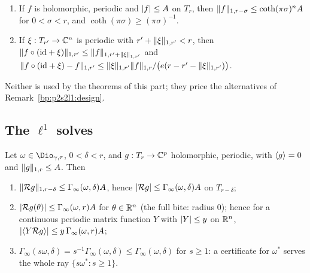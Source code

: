 \begin{lemma}\label{bp:p2s2l1:convert}
\begin{enumerate}[label=(\alph*)]
\item If $f$ is holomorphic, periodic and $\lvert f\rvert\le A$ on $T_r$, then $\lVert f\rVert_{1,r-\sigma}\le\coth(\pi\sigma)^nA$ for $0<\sigma<r$, and
  $\coth(\pi\sigma)\ge(\pi\sigma)^{-1}$.
\item If $\xi:T_{r'}\to\mathbb{C}^n$ is periodic with $r'+\lVert \xi\rVert_{1,r'}<r$, then $\lVert f\circ(\mathrm{id}+\xi)\rVert_{1,r'}\le\lVert f\rVert_{1,r'+\lVert \xi\rVert_{1,r'}}$
  and $\lVert f\circ(\mathrm{id}+\xi)-f\rVert_{1,r'}\le\lVert \xi\rVert_{1,r'}\lVert f\rVert_{1,r}/\bigl(e(r-r'-\lVert \xi\rVert_{1,r'})\bigr)$.
\end{enumerate}
Neither is used by the theorems of this part; they price the alternatives of Remark~\ref{bp:p2s2l1:design}.
\end{lemma}

\subsection{The $\ell^1$ solves}\label{bp:p2s2l1:sec-solve}

\begin{lemma}\label{bp:p2s2l1:solve}
Let $\omega\in\Dio_{\gamma,\tau}$, $0<\delta<r$, and $g:T_r\to\mathbb{C}^p$ holomorphic, periodic, with $\langle g\rangle=0$ and $\lVert g\rVert_{1,r}\le A$. Then
\begin{enumerate}[label=(\alph*)]
\item $\lVert \mathcal Rg\rVert_{1,r-\delta}\le\Gamma_\infty(\omega,\delta)A$, hence $\lvert \mathcal Rg\rvert\le\Gamma_\infty(\omega,\delta)A$ on $T_{r-\delta}$;
\item $\lvert \mathcal Rg(\theta)\rvert\le\Gamma_\infty(\omega,r)A$ for $\theta\in\mathbb{R}^n$ (the full bite: radius $0$); hence for a continuous periodic matrix function
  $Y$ with $\lvert Y\rvert\le y$ on $\mathbb{R}^n$, $\lvert \langle Y\mathcal Rg\rangle\rvert\le y\,\Gamma_\infty(\omega,r)A$;
\item $\Gamma_\infty(s\omega,\delta)=s^{-1}\Gamma_\infty(\omega,\delta)\le\Gamma_\infty(\omega,\delta)$ for $s\ge1$: a certificate for $\omega^*$ serves the whole
  ray $\{s\omega^*:s\ge1\}$.
\end{enumerate}
\end{lemma}

